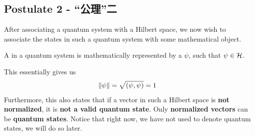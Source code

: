 \subsection{Postulate 2 - “公理”二}
After associating a quantum system with a Hilbert space, we now wish to associate the states in such a quantum system with some mathematical object.
\begin{postulate}
    A  in a quantum system is mathematically represented by a  $\psi$, such that $\psi \in \mathcal{H}$.
\end{postulate}
This essentially gives us
$$\norm{\psi} = \sqrt{(\psi, \psi)} = 1$$
Furthermore, this also states that if a vector in such a Hilbert space is \textbf{not normalized}, it is \textbf{not a valid quantum state}. Only \textbf{normalized vectors} can be \textbf{quantum states}. Notice that right now, we have not used  to denote quantum states, we will do so later.
